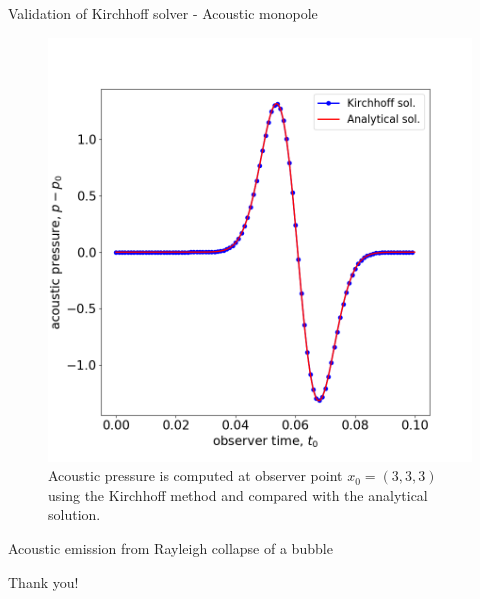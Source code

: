 \documentclass[10pt, aspectratio=169]{beamer}
\begin{document}
\begin{frame}{Validation of Kirchhoff solver - Acoustic monopole}
	\begin{figure}
		\centering
		\includegraphics[scale=0.26]{images/monopole.png}
		\caption{Acoustic pressure is computed at observer point $x_{0} = (3, 3, 3)$ using the Kirchhoff method and compared with the analytical solution.}
	\end{figure}
\end{frame}

\begin{frame}{Acoustic emission from Rayleigh collapse of a bubble}
	
\end{frame}




\begin{frame}[standout]
	Thank you!
\end{frame}
\end{document}

